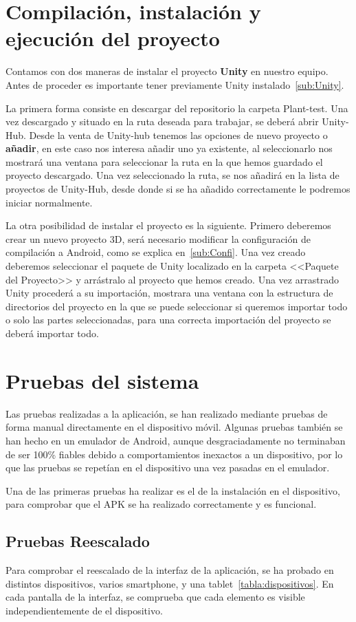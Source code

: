 \section{Compilación, instalación y ejecución del proyecto}
Contamos con dos maneras de instalar el proyecto \textbf{Unity} en nuestro equipo. Antes de proceder es importante tener previamente Unity instalado~\ref{sub:Unity}.


La primera forma consiste en descargar del repositorio la carpeta Plant-test. Una vez descargado y situado en la ruta deseada para trabajar, se deberá abrir Unity-Hub. Desde la venta de Unity-hub tenemos las opciones de nuevo proyecto o \textbf{añadir}, en este caso nos interesa añadir uno ya existente, al seleccionarlo nos mostrará una ventana para seleccionar la ruta en la que hemos guardado el proyecto descargado. Una vez seleccionado la ruta, se nos añadirá en la lista de proyectos de Unity-Hub, desde donde si se ha añadido correctamente le podremos iniciar normalmente.


La otra posibilidad de instalar el proyecto es la siguiente. Primero deberemos crear un nuevo proyecto 3D, será necesario modificar la configuración de compilación a Android, como se explica en~\ref{sub:Confi}. Una vez creado deberemos seleccionar el paquete de Unity localizado en la carpeta <<Paquete del Proyecto>> y arrástralo al proyecto que hemos creado. Una vez arrastrado Unity procederá a su importación, mostrara una ventana con la estructura de directorios del proyecto en la que se puede seleccionar si queremos importar todo o solo las partes seleccionadas, para una correcta importación del proyecto se deberá importar todo.


\section{Pruebas del sistema}
Las pruebas realizadas a la aplicación, se han realizado mediante pruebas de forma manual directamente en el dispositivo móvil. Algunas pruebas también se han hecho en un emulador de Android, aunque desgraciadamente no terminaban de ser 100\% fiables debido a comportamientos inexactos a un dispositivo, por lo que las pruebas se repetían en el dispositivo una vez pasadas en el emulador. 

Una de las primeras pruebas ha realizar es el de la instalación en el dispositivo, para comprobar que el APK se ha realizado correctamente y es funcional. 

\subsection{Pruebas Reescalado}
Para comprobar el reescalado de la interfaz de la aplicación, se ha probado en distintos dispositivos, varios smartphone, y una tablet~\ref{tabla:dispositivos}. En cada pantalla de la interfaz, se comprueba que cada elemento es visible independientemente de el dispositivo.

